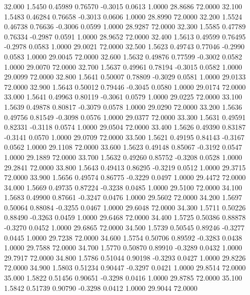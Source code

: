  32.000   1.5450   0.45989   0.76570  -0.3015   0.0613   1.0000  28.8686  72.0000
  32.100   1.5483   0.46284   0.76658  -0.3013   0.0606   1.0000  28.8990  72.0000
  32.200   1.5524   0.46738   0.76636  -0.3006   0.0599   1.0000  28.9287  72.0000
  32.300   1.5585   0.47789   0.76334  -0.2987   0.0591   1.0000  28.9652  72.0000
  32.400   1.5613   0.49599   0.76495  -0.2978   0.0583   1.0000  29.0021  72.0000
  32.500   1.5623   0.49743   0.77046  -0.2990   0.0583   1.0000  29.0045  72.0000
  32.600   1.5632   0.49876   0.77599  -0.3002   0.0582   1.0000  29.0070  72.0000
  32.700   1.5637   0.49961   0.78194  -0.3015   0.0582   1.0000  29.0099  72.0000
  32.800   1.5641   0.50007   0.78809  -0.3029   0.0581   1.0000  29.0133  72.0000
  32.900   1.5643   0.50012   0.79446  -0.3045   0.0580   1.0000  29.0174  72.0000
  33.000   1.5641   0.49963   0.80119  -0.3061   0.0579   1.0000  29.0225  72.0000
  33.100   1.5639   0.49878   0.80817  -0.3079   0.0578   1.0000  29.0290  72.0000
  33.200   1.5636   0.49756   0.81549  -0.3098   0.0576   1.0000  29.0377  72.0000
  33.300   1.5631   0.49591   0.82331  -0.3118   0.0574   1.0000  29.0504  72.0000
  33.400   1.5626   0.49390   0.83187  -0.3141   0.0570   1.0000  29.0709  72.0000
  33.500   1.5621   0.49195   0.84143  -0.3167   0.0562   1.0000  29.1108  72.0000
  33.600   1.5623   0.49148   0.85067  -0.3192   0.0547   1.0000  29.1889  72.0000
  33.700   1.5632   0.49260   0.85752  -0.3208   0.0528   1.0000  29.2841  72.0000
  33.800   1.5643   0.49413   0.86295  -0.3219   0.0512   1.0000  29.3715  72.0000
  33.900   1.5656   0.49574   0.86775  -0.3229   0.0497   1.0000  29.4472  72.0000
  34.000   1.5669   0.49735   0.87224  -0.3238   0.0485   1.0000  29.5100  72.0000
  34.100   1.5683   0.49900   0.87661  -0.3247   0.0476   1.0000  29.5602  72.0000
  34.200   1.5697   0.50064   0.88084  -0.3255   0.0467   1.0000  29.6048  72.0000
  34.300   1.5711   0.50226   0.88490  -0.3263   0.0459   1.0000  29.6468  72.0000
  34.400   1.5725   0.50386   0.88878  -0.3270   0.0452   1.0000  29.6865  72.0000
  34.500   1.5739   0.50545   0.89246  -0.3277   0.0445   1.0000  29.7238  72.0000
  34.600   1.5754   0.50706   0.89592  -0.3283   0.0438   1.0000  29.7588  72.0000
  34.700   1.5770   0.50870   0.89910  -0.3289   0.0432   1.0000  29.7917  72.0000
  34.800   1.5786   0.51044   0.90198  -0.3293   0.0427   1.0000  29.8226  72.0000
  34.900   1.5803   0.51234   0.90447  -0.3297   0.0421   1.0000  29.8514  72.0000
  35.000   1.5822   0.51456   0.90651  -0.3298   0.0416   1.0000  29.8785  72.0000
  35.100   1.5842   0.51739   0.90790  -0.3298   0.0412   1.0000  29.9044  72.0000

